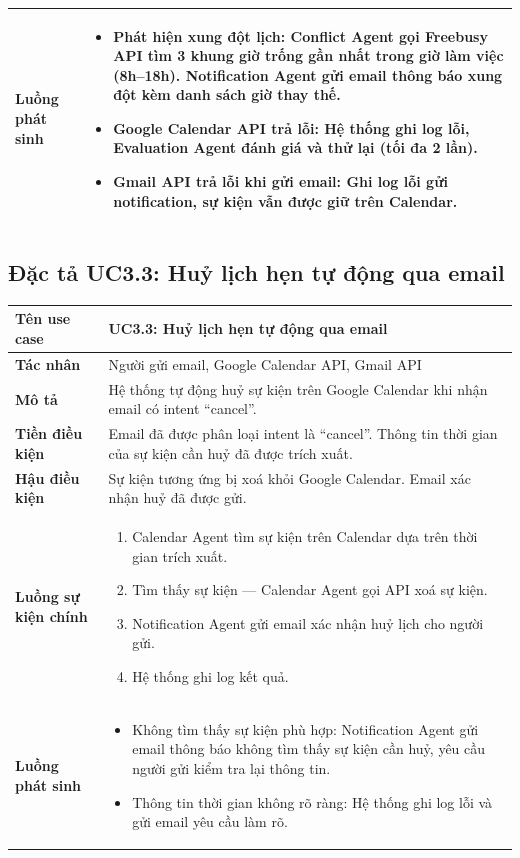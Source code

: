 \documentclass[../DoAn.tex]{subfiles}
\begin{document}
\begin{table}[H]
\begin{tabular}{|p{3.5cm}|p{10cm}|}
\hline
\textbf{Luồng phát sinh} &
\begin{itemize}
    \item[2a.] Phát hiện xung đột lịch: Conflict Agent gọi Freebusy API tìm 3 khung giờ trống gần nhất trong giờ làm việc (8h--18h). Notification Agent gửi email thông báo xung đột kèm danh sách giờ thay thế.
    \item[3a.] Google Calendar API trả lỗi: Hệ thống ghi log lỗi, Evaluation Agent đánh giá và thử lại (tối đa 2 lần).
    \item[5a.] Gmail API trả lỗi khi gửi email: Ghi log lỗi gửi notification, sự kiện vẫn được giữ trên Calendar.
\end{itemize} \\
\hline
\end{tabular}
\end{table}

\subsection{Đặc tả UC3.3: Huỷ lịch hẹn tự động qua email}

\begin{table}[H]
\centering
\small
\begin{tabular}{|p{3.5cm}|p{10cm}|}
\hline
\textbf{Tên use case} & UC3.3: Huỷ lịch hẹn tự động qua email \\
\hline
\textbf{Tác nhân} & Người gửi email, Google Calendar API, Gmail API \\
\hline
\textbf{Mô tả} & Hệ thống tự động huỷ sự kiện trên Google Calendar khi nhận email có intent ``cancel''. \\
\hline
\textbf{Tiền điều kiện} & Email đã được phân loại intent là ``cancel''. Thông tin thời gian của sự kiện cần huỷ đã được trích xuất. \\
\hline
\textbf{Hậu điều kiện} & Sự kiện tương ứng bị xoá khỏi Google Calendar. Email xác nhận huỷ đã được gửi. \\
\hline
\textbf{Luồng sự kiện chính} &
\begin{enumerate}
    \item Calendar Agent tìm sự kiện trên Calendar dựa trên thời gian trích xuất.
    \item Tìm thấy sự kiện — Calendar Agent gọi API xoá sự kiện.
    \item Notification Agent gửi email xác nhận huỷ lịch cho người gửi.
    \item Hệ thống ghi log kết quả.
\end{enumerate} \\
\hline
\textbf{Luồng phát sinh} &
\begin{itemize}
    \item[1a.] Không tìm thấy sự kiện phù hợp: Notification Agent gửi email thông báo không tìm thấy sự kiện cần huỷ, yêu cầu người gửi kiểm tra lại thông tin.
    \item[1b.] Thông tin thời gian không rõ ràng: Hệ thống ghi log lỗi và gửi email yêu cầu làm rõ.
\end{itemize} \\
\hline
\end{tabular}
\end{table}
\end{document}
